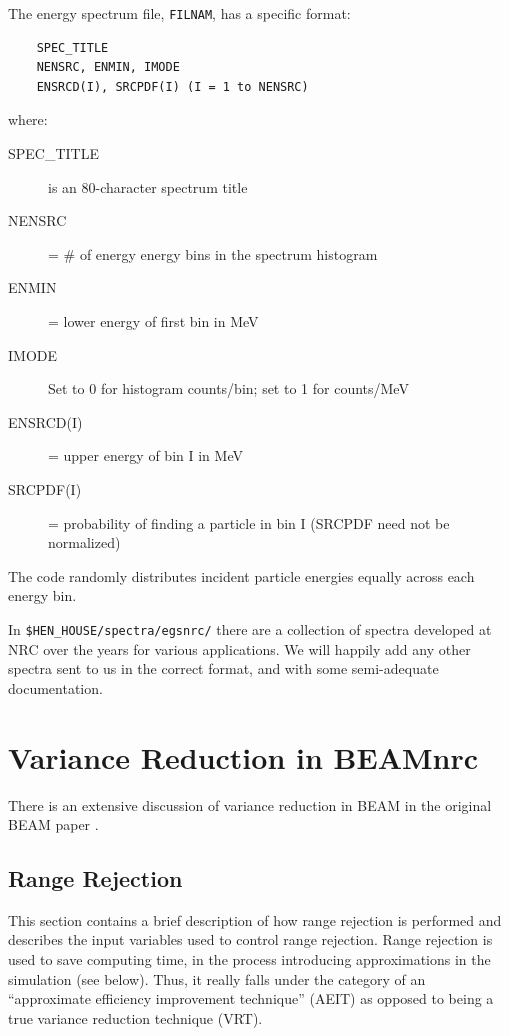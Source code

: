 \documentclass[12pt,twoside]{article}
\begin{document}
The energy spectrum file, \verb+FILNAM+, has a specific format:
\begin{verbatim}
	SPEC_TITLE
	NENSRC, ENMIN, IMODE
	ENSRCD(I), SRCPDF(I) (I = 1 to NENSRC)
\end{verbatim}
where:
\begin{description}
\item [SPEC\_TITLE] is an 80-character spectrum title
\item [NENSRC] = \# of energy energy bins in the spectrum histogram
\item [ENMIN] = lower energy of first bin in MeV
\item [IMODE] Set to 0 for histogram counts/bin; set to 1 for counts/MeV
\item [ENSRCD(I)] = upper energy of bin I in MeV
\item [SRCPDF(I)] = probability of finding a particle in bin I (SRCPDF
need not be normalized)
\end{description}
The code randomly distributes incident particle energies equally across
each energy bin.

In \verb+$HEN_HOUSE/spectra/egsnrc/+ there are a collection of spectra
developed at NRC over the years for various applications.  We will
happily add any other
spectra sent to us in the correct format, and with some semi-adequate
documentation.

\newpage
\section{Variance Reduction in BEAMnrc}
There is an extensive discussion of variance reduction in BEAM in the
original BEAM paper \cite{Ro95}.

\subsection{Range Rejection}
\label{RR}

This section contains a brief description of how range rejection
is performed and describes the input variables used to control range
rejection.  Range rejection is used to save computing time, in the process
introducing approximations in the simulation (see below).  Thus, it really falls
under the category of an ``approximate efficiency improvement technique'' (AEIT)
as opposed to being a true variance reduction technique (VRT).
\end{document}

